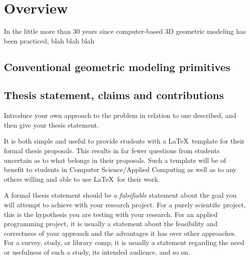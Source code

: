 %
%
\chapter{Overview}\label{ch:overview}



In the little more than 30 years since computer-based 3D geometric modeling
has been practiced, blah blah blah

\section{Conventional geometric modeling primitives} \label{sec:motivation}

\section{Thesis statement, claims and contributions}

Introduce your own approach to the problem in relation to one described, and then
give your thesis statement.

\begin{Thesis}
It is both simple and useful to provide students with a \LaTeX\ template
for their formal thesis proposals.  This results in far fewer
questions from students uncertain as to what belongs in their proposals.  Such a template
will be of benefit to students in Computer Science/Applied Computing as well as to any
others willing and able to use \LaTeX\ for their work.
\end{Thesis}

A formal thesis statement should be a \emph{falsifiable} statement about the goal
you will attempt to achieve with your research project.  For a purely scientific
project, this is the hypothesis you are testing with your research.  For an applied
programming project, it is usually a statement about the feasibility and correctness
of your approach and the advantages it has over other approaches.  For a survey, study,
or library comp, it is usually a statement regarding the need or usefulness of such
a study, its intended audience, and so on.

